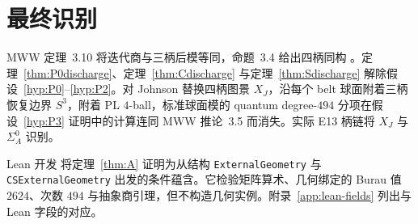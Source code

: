 \section{最终识别}\label{sec:final-identifications}

MWW 定理~3.10 将迭代商与三柄后模等同，命题~3.4 给出四柄同构 \cite{ManolescuWalkerWedrich2023}。定理~\ref{thm:P0discharge}、定理~\ref{thm:Cdischarge} 与定理~\ref{thm:Sdischarge} 解除假设~\ref{hyp:P0}--\ref{hyp:P2}。对 Johnson 替换四柄图景 $X_J$，沿每个 belt 球面附着三柄恢复边界 $S^3$，附着 PL $4$-ball，标准球面模的 quantum degree-$494$ 分项在假设~\ref{hyp:P3} 证明中的计算连同 MWW 推论~3.5 而消失。实际 E13 柄链将 $X_J$ 与 $\Sigma_A^0$ 识别。

\begin{remark}[形式化边界]\label{rem:lean-boundary}
Lean 开发 \cite{Lean4} 将定理~\ref{thm:A} 证明为从结构 \texttt{ExternalGeometry} 与 \texttt{CSExternalGeometry} 出发的条件蕴含。它检验矩阵算术、几何绑定的 Burau 值 $2624$、次数 $494$ 与抽象商引理，但不构造几何实例。附录~\ref{app:lean-fields} 列出与 Lean 字段的对应。
\end{remark}
